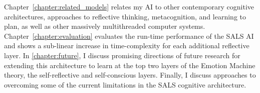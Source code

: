 {\mbox{Chapter~\ref{chapter:related_models}}} relates my AI to other
contemporary cognitive architectures, approaches to reflective
thinking, metacognition, and learning to plan, as well as other
massively multithreaded computer systems.
{\mbox{Chapter~\ref{chapter:evaluation}}} evaluates the run-time
performance of the SALS AI and shows a sub-linear increase in
time-complexity for each additional reflective layer.  In
{\mbox{\autoref{chapter:future}}}, I discuss promising directions of
future research for extending this architecture to learn at the top
two layers of the Emotion Machine theory, the self-reflective and
self-conscious layers.  Finally, I discuss approaches to overcoming
some of the current limitations in the SALS cognitive architecture.

